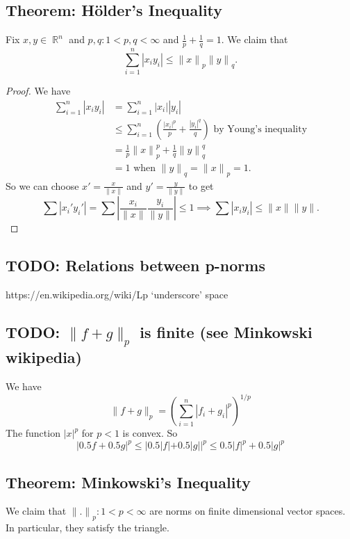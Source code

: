 \documentclass{article}
\DeclareMathOperator\R{\mathbb{R}}
\newcommand{\norm}{{\|.\|}}
\begin{document}
\subsection*{Theorem: Hölder's Inequality}
Fix $x,y \in \R^n$ and $p,q: 1 < p,q < \infty$ and $\frac{1}{p}+\frac{1}{q} = 1$. We claim that $$
\sum_{i=1}^n |x_iy_i| \leq {\|x\|}_{p} {\|y\|}_{q}.
$$
\begin{proof}
We have \begin{align*}
\sum_{i=1}^n |x_iy_i| &= \sum_{i=1}^n |x_i||y_i| \\
&\leq \sum_{i=1}^n \left( \frac{|x_i|^p}{p} + \frac{|y_i|^q}{q} \right) \text{ by Young's inequality}
\\
&= \frac{1}{p}{\|x\|}_p^p +\frac{1}{q}{\|y\|}_q^q \\
&= 1 \text{ when ${\|y\|}_q = {\|x\|}_p = 1$}.
\end{align*}
So we can choose $x' = \frac{x}{\|x\|}$ and $y' = \frac{y}{\|y\|}$ to get
$$
\sum |x_i'y_i'| = \sum \left| \frac{x_i}{\|x\|}\frac{y_i}{\|y\|} \right| \leq 1 \implies \sum |x_iy_i| \leq \|x\| \|y\|.
$$
\end{proof}
\subsection*{TODO: Relations between p-norms}
https://en.wikipedia.org/wiki/Lp `underscore' space
\subsection*{TODO: $\|f+g\|_p$ is finite (see Minkowski wikipedia)}
We have $$
\|f+g\|_p = \left(\sum_{i=1}^n |f_i+g_i|^p \right)^{1 \slash p}
$$
The function $|x|^p$ for $p<1$ is convex. So $$
|0.5f+0.5g|^p \leq |0.5|f|+0.5|g||^p \leq 0.5|f|^p +0.5|g|^p
$$
\subsection*{Theorem: Minkowski's Inequality}
We claim that $\norm_p: 1 < p < \infty$ are norms on finite dimensional vector spaces. In particular, they satisfy the triangle.
\end{document}
